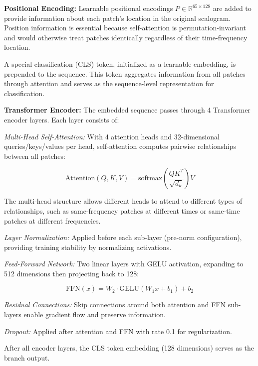 \documentclass[blue,fullpaper]{ludusofficial}  %
\begin{document}
\textbf{Positional Encoding:} Learnable positional encodings $P \in \mathbb{R}^{65 \times 128}$ are added to provide information about each patch's location in the original scalogram. Position information is essential because self-attention is permutation-invariant and would otherwise treat patches identically regardless of their time-frequency location.

A special classification (CLS) token, initialized as a learnable embedding, is prepended to the sequence. This token aggregates information from all patches through attention and serves as the sequence-level representation for classification.

\textbf{Transformer Encoder:} The embedded sequence passes through 4 Transformer encoder layers. Each layer consists of:

\textit{Multi-Head Self-Attention:} With 4 attention heads and 32-dimensional queries/keys/values per head, self-attention computes pairwise relationships between all patches:

\begin{equation}
\text{Attention}(Q, K, V) = \text{softmax}\left(\frac{QK^T}{\sqrt{d_k}}\right)V
\end{equation}

The multi-head structure allows different heads to attend to different types of relationships, such as same-frequency patches at different times or same-time patches at different frequencies.

\textit{Layer Normalization:} Applied before each sub-layer (pre-norm configuration), providing training stability by normalizing activations.

\textit{Feed-Forward Network:} Two linear layers with GELU activation, expanding to 512 dimensions then projecting back to 128:

\begin{equation}
\text{FFN}(x) = W_2 \cdot \text{GELU}(W_1 x + b_1) + b_2
\end{equation}

\textit{Residual Connections:} Skip connections around both attention and FFN sub-layers enable gradient flow and preserve information.

\textit{Dropout:} Applied after attention and FFN with rate 0.1 for regularization.

After all encoder layers, the CLS token embedding (128 dimensions) serves as the branch output.
\end{document}
